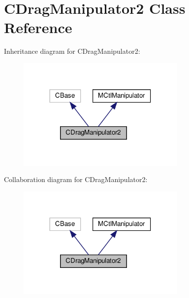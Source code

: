 \hypertarget{classCDragManipulator2}{}\section{C\+Drag\+Manipulator2 Class Reference}
\label{classCDragManipulator2}


Inheritance diagram for C\+Drag\+Manipulator2\+:
\nopagebreak
\begin{figure}[H]
\begin{center}
\leavevmode
\includegraphics[width=234pt]{classCDragManipulator2__inherit__graph}
\end{center}
\end{figure}


Collaboration diagram for C\+Drag\+Manipulator2\+:
\nopagebreak
\begin{figure}[H]
\begin{center}
\leavevmode
\includegraphics[width=234pt]{classCDragManipulator2__coll__graph}
\end{center}
\end{figure}
